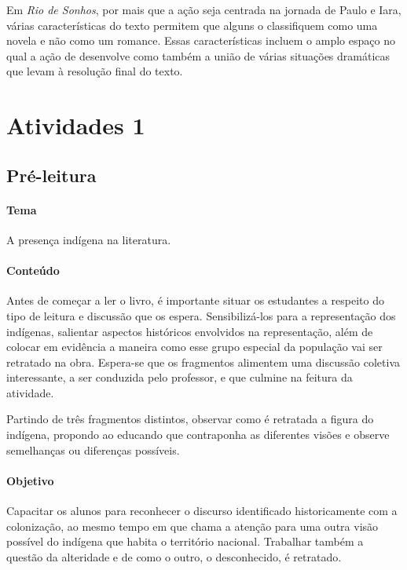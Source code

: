 \documentclass[12pt]{extarticle}
\begin{document}
Em \textit{Rio de Sonhos},  por mais que a ação seja centrada na jornada de Paulo e Iara,  
várias características do texto  permitem que alguns o classifiquem como uma novela e não 
como um romance.
Essas características incluem o amplo espaço no qual a ação de desenvolve  como também a união de várias situações dramáticas  que levam à resolução final do texto.


\section{Atividades 1}
\subsection{Pré-leitura}

\paragraph{Tema} A presença indígena na literatura.

\paragraph{Conteúdo}  
Antes de começar a ler o livro, é importante situar os estudantes a
respeito do tipo de leitura e discussão que os espera. Sensibilizá-los
para a representação dos indígenas, salientar aspectos históricos
envolvidos na representação, além de colocar em evidência a maneira como
esse grupo especial da população vai ser retratado na obra. Espera-se
que os fragmentos alimentem uma discussão coletiva interessante, a ser
conduzida pelo professor, e que culmine na feitura da atividade.


Partindo de três fragmentos distintos, observar como é retratada a
figura do indígena, propondo ao educando que contraponha as diferentes
visões e observe semelhanças ou diferenças possíveis.

\paragraph{Objetivo}
Capacitar os alunos para reconhecer o discurso identificado
historicamente com a colonização, ao mesmo tempo em que chama a
atenção para uma outra visão possível do indígena que habita o
território nacional. Trabalhar também a questão da alteridade e de
como o outro, o desconhecido, é retratado.
\end{document}
